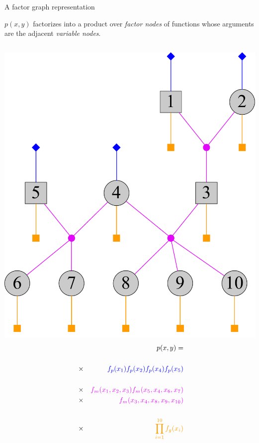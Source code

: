 \documentclass[letter,graphicx]{beamer}
\begin{document}
\begin{frame}{A factor graph representation}

$p(x,y)$ factorizes into a product over {\em factor nodes} of functions whose arguments
are the adjacent {\em variable nodes}.
\begin{columns}
\hspace*{-2em}
\includegraphics[width = 1.60\textwidth]{./images/three-gen-basic-factor-color.pdf}
\begin{eqnarray*}
 & & p(x,y) = \\
~\\
 &\times &  \textcolor{pcolor}{f_p(x_1)f_p(x_2)f_p(x_4)f_p(x_5)}  \\
~ \\ 
 & \times& \textcolor{mcolor}{f_m(x_1,x_2,x_3) f_m(x_5,x_4,x_6, x_7)}  \\
 & \times& \textcolor{mcolor}{f_m(x_3,x_4,x_8, x_9, x_{10})}  \\
~\\
 & \times& \textcolor{gcolor}{\prod_{i=1}^{10} f_g(x_i)}
\end{eqnarray*}
\end{columns}
\end{frame}
\end{document}
